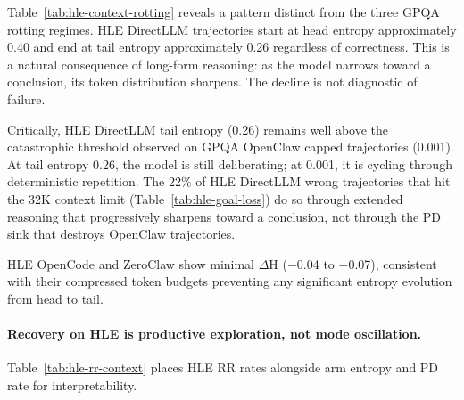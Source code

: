 
Table~\ref{tab:hle-context-rotting} reveals a pattern distinct from the three
GPQA rotting regimes.
HLE DirectLLM trajectories start at head entropy approximately 0.40 and end at
tail entropy approximately 0.26 regardless of correctness.
This is a natural consequence of long-form reasoning: as the model narrows
toward a conclusion, its token distribution sharpens.
The decline is not diagnostic of failure.

Critically, HLE DirectLLM tail entropy (0.26) remains well above the
catastrophic threshold observed on GPQA OpenClaw capped trajectories (0.001).
At tail entropy 0.26, the model is still deliberating; at 0.001, it is cycling
through deterministic repetition.
The 22\% of HLE DirectLLM wrong trajectories that hit the 32K context limit
(Table~\ref{tab:hle-goal-loss}) do so through extended reasoning that
progressively sharpens toward a conclusion, not through the PD sink that
destroys OpenClaw trajectories.

HLE OpenCode and ZeroClaw show minimal $\Delta$H ($-$0.04 to $-$0.07),
consistent with their compressed token budgets preventing any significant
entropy evolution from head to tail.

\paragraph{Recovery on HLE is productive exploration, not mode oscillation.}

Table~\ref{tab:hle-rr-context} places HLE RR rates alongside arm entropy and
PD rate for interpretability.

